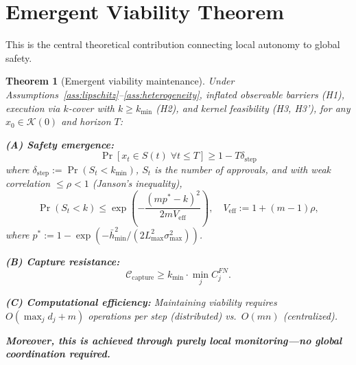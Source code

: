 \documentclass[11pt,a4paper]{article}
\newtheorem{theorem}{Theorem}
\begin{document}
\section{Emergent Viability Theorem}

This is the central theoretical contribution connecting local autonomy to global safety.

\begin{theorem}[Emergent viability maintenance]
\label{thm:emergence}
Under Assumptions~\ref{ass:lipschitz}--\ref{ass:heterogeneity}, inflated observable barriers (H1), execution via $k$-cover with $k \geq k_{\min}$ (H2), and kernel feasibility (H3, H3'), for any $x_0 \in \mathcal{K}(0)$ and horizon $T$:

\textbf{(A) Safety emergence:}
$$\Pr[x_t \in S(t) \;\forall t \leq T] \geq 1 - T\delta_{\text{step}}$$
where $\delta_{\text{step}} := \Pr(S_t < k_{\min})$, $S_t$ is the number of approvals, and with weak correlation $\leq \rho < 1$ (Janson's inequality),
$$\Pr(S_t < k) \leq \exp\left(-\frac{(mp^* - k)^2}{2mV_{\text{eff}}}\right), \quad V_{\text{eff}} := 1 + (m-1)\rho,$$
where $p^* := 1 - \exp(-\bar{h}_{\min}^2/(2L_{\max}^2\sigma_{\max}^2))$.

\textbf{(B) Capture resistance:}
$$\mathcal{C}_{\text{capture}} \geq k_{\min} \cdot \min_j C_j^{FN}.$$

\textbf{(C) Computational efficiency:} Maintaining viability requires $O(\max_j d_j + m)$ operations per step (distributed) vs.~$O(mn)$ (centralized).

\textbf{Moreover, this is achieved through purely local monitoring—no global coordination required.}
\end{theorem}
\end{document}
